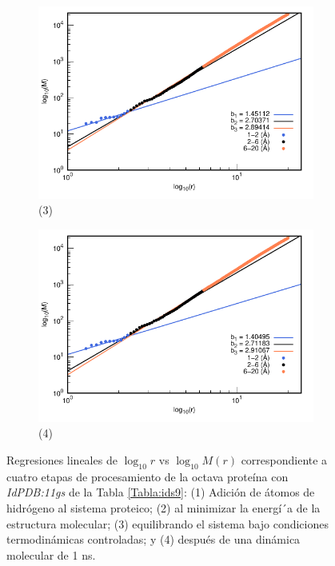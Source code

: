 \begin{figure}[H]
	\vspace{0cm} %
	
	\hspace{-0.3cm} 
	\begin{subfigure}{0.49\textwidth}
		\centering
		\includegraphics[width=\linewidth,page=1]{graphs/PDBs/11gs/11gsEq.pdf}
		\caption{(3)}
	\end{subfigure}
	\hspace{0.2cm}
	\begin{subfigure}{0.49\textwidth} %
		\centering
		\includegraphics[width=\linewidth,page=1]{graphs/PDBs/11gs/11gs1ns.pdf}
		\caption{(4)}
	\end{subfigure}
	
	\caption{Regresiones lineales de $\log_{10}r$ vs $\log_{10}M(r)$ correspondiente a cuatro etapas de procesamiento de la octava prote\'{i}na con \textit{IdPDB:11gs} de la Tabla \ref{Tabla:ids9}: (1) Adici\'{o}n de \'{a}tomos de hidr\'{o}geno al sistema proteico; (2) al minimizar la energ\'{i´}a de la estructura molecular; (3) equilibrando el sistema bajo condiciones termodin\'{a}micas controladas; y (4) despu\'{e}s de una din\'{a}mica molecular de 1 ns.}
	\label{fig:11gs}
\end{figure}

